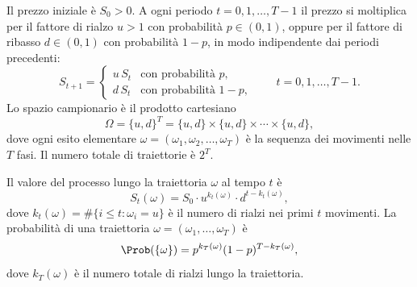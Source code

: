 Il prezzo iniziale \`{e} $S_0>0$. A ogni periodo $t=0,1,\ldots,T-1$
il prezzo si moltiplica per il fattore di rialzo $u>1$ con
probabilit\`{a} $p\in(0,1)$, oppure per il fattore di ribasso
$d\in(0,1)$ con probabilit\`{a} $1-p$, in modo indipendente dai
periodi precedenti:
\[
S_{t+1}=\begin{cases}
u\,S_t & \text{con probabilit\`{a} }p,\\
d\,S_t & \text{con probabilit\`{a} }1-p,
\end{cases}
\qquad t=0,1,\ldots,T-1.
\]
Lo spazio campionario \`{e} il prodotto cartesiano
\[
\Omega=\{u,d\}^T=\{u,d\}\times\{u,d\}\times\cdots\times\{u,d\},
\]
dove ogni esito elementare $\omega=(\omega_1,\omega_2,\ldots,\omega_T)$
\`{e} la sequenza dei movimenti nelle $T$ fasi. Il numero totale di
traiettorie \`{e} $2^T$.

Il valore del processo lungo la traiettoria $\omega$ al tempo $t$ \`{e}
\[
S_t(\omega)=S_0\cdot u^{k_t(\omega)}\cdot d^{t-k_t(\omega)},
\]
dove $k_t(\omega)=\#\{i\leq t:\omega_i=u\}$ \`{e} il numero di rialzi
nei primi $t$ movimenti. La probabilit\`{a} di una traiettoria
$\omega=(\omega_1,\ldots,\omega_T)$ \`{e}
\[
\Prob(\{\omega\})=p^{k_T(\omega)}(1-p)^{T-k_T(\omega)},
\]
dove $k_T(\omega)$ \`{e} il numero totale di rialzi lungo la
traiettoria.

